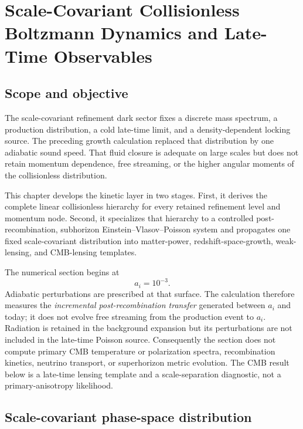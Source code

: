 \chapter{Scale-Covariant Collisionless Boltzmann Dynamics and Late-Time Observables}


\label{ch:collisionless-boltzmann-observables}

\section{Scope and objective}

The scale-covariant refinement dark sector fixes a discrete mass spectrum, a production distribution, a cold late-time limit, and a density-dependent locking source.  The preceding growth calculation replaced that distribution by one adiabatic sound speed.  That fluid closure is adequate on large scales but does not retain momentum dependence, free streaming, or the higher angular moments of the collisionless distribution.

This chapter develops the kinetic layer in two stages.  First, it derives the complete linear collisionless hierarchy for every retained refinement level and momentum node.  Second, it specializes that hierarchy to a controlled post-recombination, subhorizon Einstein--Vlasov--Poisson system and propagates one fixed scale-covariant distribution into matter-power, redshift-space-growth, weak-lensing, and CMB-lensing templates.

The numerical section begins at
\begin{equation}
 a_i=10^{-3}.
 \label{eq:cb-initial-scale}
\end{equation}
Adiabatic perturbations are prescribed at that surface.  The calculation therefore measures the \emph{incremental post-recombination transfer} generated between $a_i$ and today; it does not evolve free streaming from the production event to $a_i$.  Radiation is retained in the background expansion but its perturbations are not included in the late-time Poisson source.  Consequently the section does not compute primary CMB temperature or polarization spectra, recombination kinetics, neutrino transport, or superhorizon metric evolution.  The CMB result below is a late-time lensing template and a scale-separation diagnostic, not a primary-anisotropy likelihood.

\section{Scale-covariant phase-space distribution}

